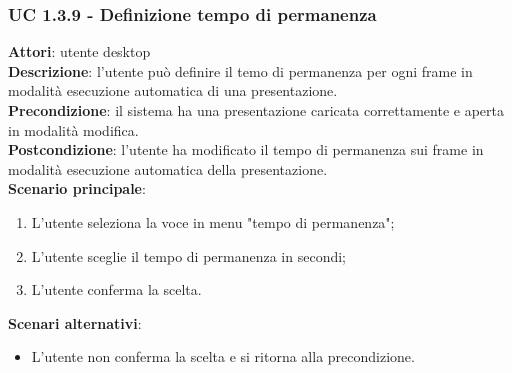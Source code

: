 \subsubsection{UC 1.3.9 - Definizione tempo di permanenza}{
	\label{uc1.3.9}
	\textbf{Attori}: utente desktop \\
	\textbf{Descrizione}: l'utente può definire il temo di permanenza per ogni frame in modalità esecuzione automatica di una presentazione. \\
	\textbf{Precondizione}: il sistema ha una presentazione caricata correttamente e aperta in modalità modifica.	\\
	\textbf{Postcondizione}: l'utente ha modificato il tempo di permanenza sui frame in modalità esecuzione automatica della presentazione.	\\
	\textbf{Scenario principale}:
	\begin{enumerate}
		\item L'utente seleziona la voce in menu "tempo di permanenza";
		\item L'utente sceglie il tempo di permanenza in secondi;
		\item L'utente conferma la scelta.
	\end{enumerate}
	\textbf{Scenari alternativi}:
	\begin{itemize}
		\item L'utente non conferma la scelta  e si ritorna alla precondizione.
	\end{itemize}
}